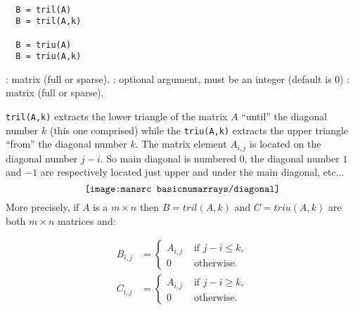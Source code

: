 \begin{mandesc}
  \\
\end{mandesc}
\begin{calling_sequence}
\begin{verbatim}
  B = tril(A)
  B = tril(A,k)
  
  B = triu(A)
  B = triu(A,k)
\end{verbatim}
\end{calling_sequence}
\begin{parameters}
  \begin{varlist}
    : matrix (full or sparse).
    : optional argument, must be an integer (default is $0$)
    : matrix (full or sparse).
  \end{varlist}
\end{parameters}
\begin{mandescription}
  \verb+tril(A,k)+ extracts the lower triangle of the matrix $A$ ``until'' the diagonal number $k$
  (this one comprised) while the \verb+triu(A,k)+ extracts the upper triangle ``from'' the  diagonal
  number $k$. The matrix element $A_{i,j}$ is located on the diagonal number $j-i$. So main 
  diagonal is numbered $0$, the diagonal number $1$ and $-1$ are respectively located just 
  upper and under the main diagonal, etc...
  $$
  \texttt{[image: \\mansrc basicnumarrays/diagonal]} 
  $$
  More precisely, if $A$ is a $m \times n$ then   $B = tril(A,k)$ and $C=triu(A,k)$ are both $m \times n$ matrices and:


  \begin{align*}
  B_{i,j} &= 
  \begin{cases}
    A_{i,j} & \text{ if $j-i \le k$}, \\
    0  &  \text{ otherwise.}
  \end{cases} \\
  C_{i,j} &= 
  \begin{cases}  A_{i,j} &\text{ if $j-i \ge k$}, \\
      0   & \text{ otherwise}.
  \end{cases}
  \end{align*}

\end{mandescription}
